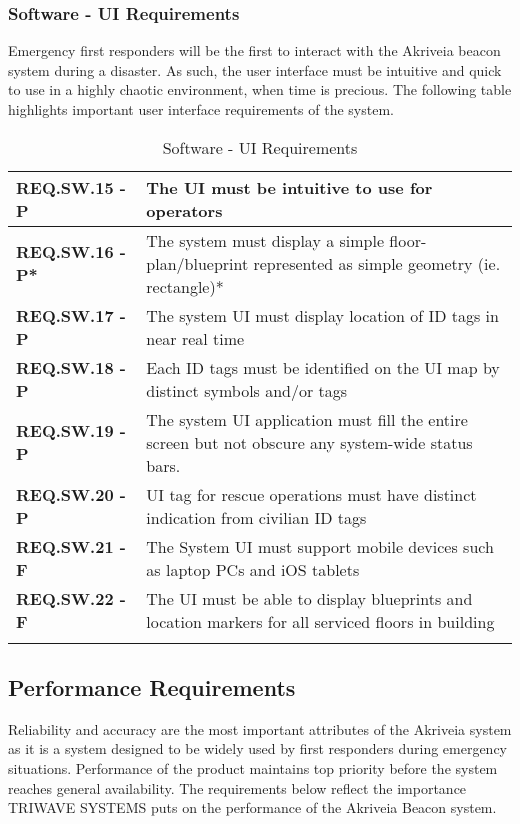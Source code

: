\break
\subsubsection{Software - UI Requirements}
Emergency first responders will be the first to interact with the Akriveia beacon system during a disaster. As such, the user interface must be intuitive and quick to use in a highly chaotic environment, when time is precious. The following table highlights important user interface requirements of the system.
\bigskip

\bgroup
\def\arraystretch{1.5}
\begin{longtable}[H]{ | m{3.5cm} | m{12.5cm} |}
\hline
 \textbf{REQ.SW.15 - P} & The \Gls{UI} must be intuitive to use for operators \\
\hline
 \textbf{REQ.SW.16 - P*} & The system must display a simple floor-plan/blueprint represented as simple geometry (ie. rectangle)* \\
\hline
 \textbf{REQ.SW.17 - P} & The system UI must display location of ID tags in near real time \\
\hline
 \textbf{REQ.SW.18 - P} & Each ID tags must be identified on the UI map by distinct symbols and/or tags \\
\hline
 \textbf{REQ.SW.19 - P} & The system UI application must fill the entire screen but not obscure any system-wide status bars. \\
\hline
 \textbf{REQ.SW.20 - P} & UI tag for rescue operations must have distinct indication from civilian ID tags \\
\hline
 \textbf{REQ.SW.21 - F} & The System UI must support mobile devices such as laptop PCs and \Gls{iOS} tablets \\
\hline
 \textbf{REQ.SW.22 - F} & The UI must be able to display blueprints and location markers for all serviced floors in building \\
\hline
\caption{Software - UI Requirements}
\end{longtable}
\break

\subsection{Performance Requirements}
Reliability and accuracy are the most important attributes of the Akriveia system as it is a system designed to be widely used by first responders during emergency situations. Performance of the product maintains top priority before the system reaches general availability. The requirements below reflect the importance TRIWAVE SYSTEMS puts on the performance of the Akriveia Beacon system.

